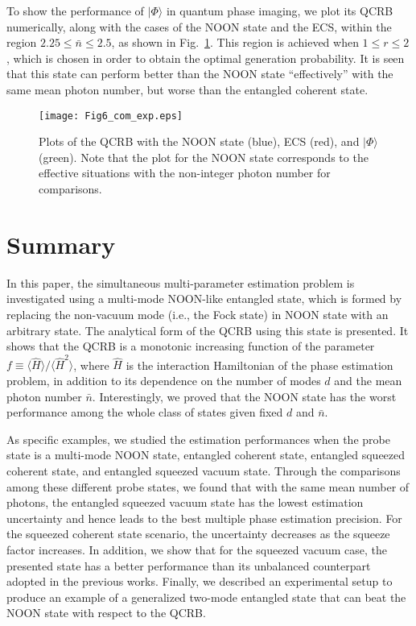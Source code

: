 \documentclass[aps,pra,reprint,showpacs,groupedaddress]{revtex4-1}
\begin{document}
To show the performance of $|\Phi\rangle$ in quantum phase imaging, we plot its QCRB numerically, along with the cases of the NOON state and the ECS, within the region $2.25\leq \bar{n} \leq 2.5$, as shown in Fig.~\ref{Fig5_com_exp}. This region is achieved when $1\leq r \leq 2$, which is chosen in order to obtain the optimal generation probability.  It is seen that this state can perform better than the NOON state ``effectively'' with the same mean photon number, but worse than the entangled coherent state.


\begin{figure}[!t]
  \centering
  \texttt{[image: Fig6\_com\_exp.eps]}
  \caption{Plots of the QCRB with the NOON state (blue), ECS (red), and $|\Phi\rangle$ (green). Note that the plot for the NOON state corresponds to the effective situations with the non-integer photon number for comparisons.}\label{Fig5_com_exp}
\end{figure}





\section{Summary}



In this paper, the simultaneous multi-parameter estimation problem is investigated using a multi-mode NOON-like entangled state, which is formed by replacing the non-vacuum mode (i.e., the Fock state) in NOON state with an arbitrary state.  The analytical form of the QCRB using this state is presented.  It shows that the QCRB is a monotonic increasing function of the parameter $f \equiv \langle \hat{H} \rangle / \langle \hat{H}^2 \rangle$, where $\hat{H}$ is the interaction Hamiltonian of the phase estimation problem, in addition to its dependence on the number of modes $d$ and the mean photon number $\bar{n}$.  Interestingly, we proved that the NOON state has the worst performance among the whole class of states given fixed $d$ and $\bar{n}$.

As specific examples, we studied the estimation performances when the probe state is a multi-mode NOON state, entangled coherent state, entangled squeezed coherent state, and entangled squeezed vacuum state.  Through the comparisons among these different probe states, we found that with the same mean number of photons, the entangled squeezed vacuum state has the lowest estimation uncertainty and hence leads to the best multiple phase estimation precision.  For the squeezed coherent state scenario, the uncertainty decreases as the squeeze factor increases.  In addition, we show that for the squeezed vacuum case, the presented state has a better performance than its unbalanced counterpart adopted in the previous works.  Finally, we described an experimental setup to produce an example of a generalized two-mode entangled state that can beat the NOON state with respect to the QCRB.
\end{document}
